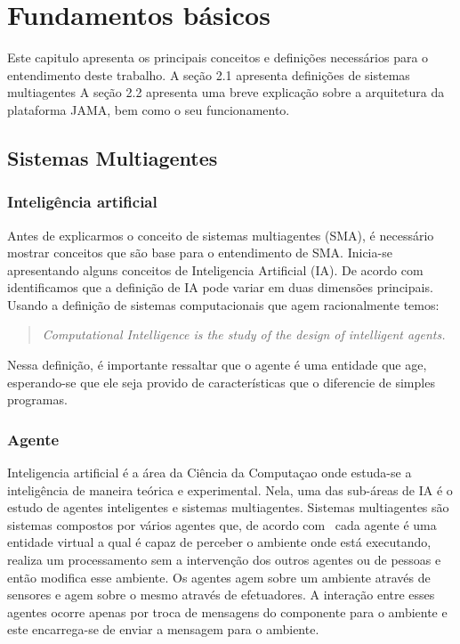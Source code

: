 \chapter{Fundamentos básicos}

Este capitulo apresenta os principais conceitos e definições necessários para o entendimento deste trabalho. A seção 2.1 apresenta definições de sistemas multiagentes
A seção 2.2 apresenta uma breve explicação sobre a arquitetura da plataforma JAMA, bem como o seu funcionamento.

\section{Sistemas Multiagentes}

\subsection{Inteligência artificial}

Antes de explicarmos o conceito de sistemas multiagentes (SMA), é necessário mostrar conceitos que são base para o entendimento de SMA. Inicia-se apresentando alguns conceitos de Inteligencia Artificial (IA). De acordo com~\cite{poole98} identificamos que a definição de IA pode variar em duas dimensões principais. Usando a definição de sistemas computacionais que agem racionalmente temos:

\begin{quote}
\emph{Computational Intelligence is the study of the design of intelligent agents.}
\end{quote}

Nessa definição, é importante ressaltar que o agente é uma entidade que age, esperando-se que ele seja provido de características que o diferencie de simples programas.

\subsection{Agente}

Inteligencia artificial é a área da Ciência da Computaçao onde estuda-se a inteligência de maneira teórica e experimental. Nela, uma das sub-áreas
de IA é o estudo de agentes inteligentes e sistemas multiagentes. Sistemas multiagentes são sistemas compostos por vários agentes que, de acordo com~\cite{wooldridge95}
cada agente é uma entidade virtual a qual é capaz de perceber o ambiente onde está executando, realiza um processamento
sem a intervenção dos outros agentes ou de pessoas e então modifica esse ambiente. Os agentes agem sobre um ambiente através de sensores e agem sobre o mesmo através
de efetuadores. A interação entre esses agentes ocorre apenas por troca de mensagens do componente para o ambiente e este encarrega-se de enviar a mensagem para o ambiente.


